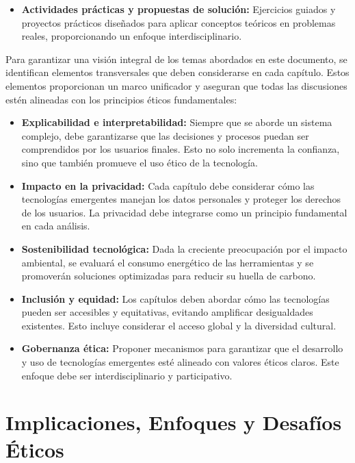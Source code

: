 \begin{refsection}
\begin{itemize}
    \item \textbf{Actividades prácticas y propuestas de solución:} 
    Ejercicios guiados y proyectos prácticos diseñados para aplicar conceptos teóricos en problemas reales, proporcionando un enfoque interdisciplinario.
\end{itemize}


Para garantizar una visión integral de los temas abordados en este documento, se identifican elementos transversales que deben considerarse en cada capítulo. Estos elementos proporcionan un marco unificador y aseguran que todas las discusiones estén alineadas con los principios éticos fundamentales:

\begin{itemize}
    \item \textbf{Explicabilidad e interpretabilidad:}  
    Siempre que se aborde un sistema complejo, debe garantizarse que las decisiones y procesos puedan ser comprendidos por los usuarios finales. Esto no solo incrementa la confianza, sino que también promueve el uso ético de la tecnología.
    
    \item \textbf{Impacto en la privacidad:}  
    Cada capítulo debe considerar cómo las tecnologías emergentes manejan los datos personales y proteger los derechos de los usuarios. La privacidad debe integrarse como un principio fundamental en cada análisis.

    \item \textbf{Sostenibilidad tecnológica:}  
    Dada la creciente preocupación por el impacto ambiental, se evaluará el consumo energético de las herramientas y se promoverán soluciones optimizadas para reducir su huella de carbono.

    \item \textbf{Inclusión y equidad:}  
    Los capítulos deben abordar cómo las tecnologías pueden ser accesibles y equitativas, evitando amplificar desigualdades existentes. Esto incluye considerar el acceso global y la diversidad cultural.

    \item \textbf{Gobernanza ética:}  
    Proponer mecanismos para garantizar que el desarrollo y uso de tecnologías emergentes esté alineado con valores éticos claros. Este enfoque debe ser interdisciplinario y participativo.
\end{itemize}




\section{Implicaciones, Enfoques y Desafíos Éticos}


\end{refsection}
